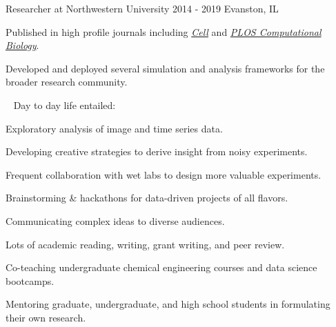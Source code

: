 \begin{cventries}
  \cventrynew
	{Researcher at Northwestern University}    
    {2014 - 2019} 
    {Evanston, IL} 
    { \begin{cvitems}	
		\item {Published in high profile journals including \href{https://doi.org/10.1016/j.cell.2019.06.023}{\emph{Cell}} and \href{https://doi.org/10.1371/journal.pcbi.1007406}{\emph{PLOS Computational Biology}}.}
		\item {Developed and deployed several simulation and analysis frameworks for the broader research community.}	
	  \end{cvitems}
     \vspace{6.0mm}
    \ \newline 
    Day to day life entailed:
    \vspace{4.0mm}
     \begin{cvitems}
     	\item {Exploratory analysis of image and time series data.}
		\item {Developing creative strategies to derive insight from noisy experiments.}
		\item {Frequent collaboration with wet labs to design more valuable experiments.}		 
		\item {Brainstorming \& hackathons for data-driven projects of all flavors.}
		\item {Communicating complex ideas to diverse audiences.}
		\item {Lots of academic reading, writing, grant writing, and peer review.}
        \item {Co-teaching undergraduate chemical engineering courses and data science bootcamps.}
        \item {Mentoring graduate, undergraduate, and high school students in formulating their own research.}         
      \end{cvitems}
     }
     
     
     
     

\end{cventries}
